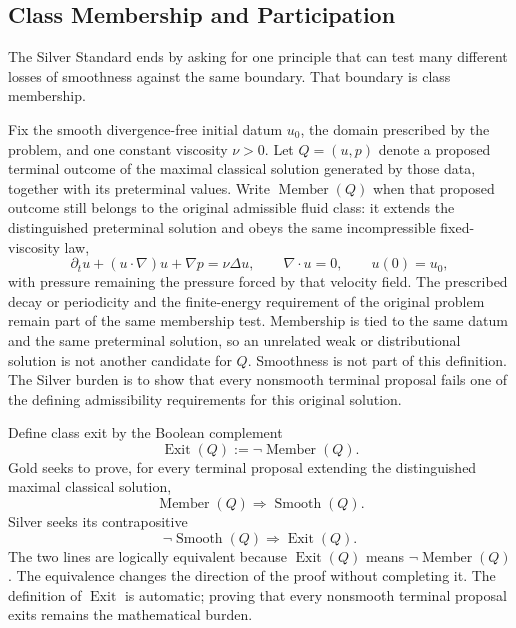 \subsection{Class Membership and Participation}\label{sub:ClassMembershipAndParticipation}

The Silver Standard ends by asking for one principle that can test many different losses of smoothness against the same boundary.
That boundary is class membership.

Fix the smooth divergence-free initial datum \(u_0\), the domain prescribed by the problem, and one constant viscosity \(\nu>0\).
Let \(Q=(u,p)\) denote a proposed terminal outcome of the maximal classical solution generated by those data, together with its preterminal values.
Write \(\operatorname{Member}(Q)\) when that proposed outcome still belongs to the original admissible fluid class: it extends the distinguished preterminal solution and obeys the same incompressible fixed-viscosity law,
\[
  \partial_tu+(u\cdot\nabla)u+\nabla p=\nu\Delta u,
  \qquad
  \nabla\cdot u=0,
  \qquad
  u(0)=u_0,
\]
with pressure remaining the pressure forced by that velocity field.
The prescribed decay or periodicity and the finite-energy requirement of the original problem remain part of the same membership test.
Membership is tied to the same datum and the same preterminal solution, so an unrelated weak or distributional solution is not another candidate for \(Q\).
Smoothness is not part of this definition.
The Silver burden is to show that every nonsmooth terminal proposal fails one of the defining admissibility requirements for this original solution.

Define class exit by the Boolean complement
\[
  \operatorname{Exit}(Q):=\neg\operatorname{Member}(Q).
\]
Gold seeks to prove, for every terminal proposal extending the distinguished maximal classical solution,
\[
  \operatorname{Member}(Q)
  \Longrightarrow
  \operatorname{Smooth}(Q).
\]
Silver seeks its contrapositive
\[
  \neg\operatorname{Smooth}(Q)
  \Longrightarrow
  \operatorname{Exit}(Q).
\]
The two lines are logically equivalent because \(\operatorname{Exit}(Q)\) means \(\neg\operatorname{Member}(Q)\).
The equivalence changes the direction of the proof without completing it.
The definition of \(\operatorname{Exit}\) is automatic; proving that every nonsmooth terminal proposal exits remains the mathematical burden.

